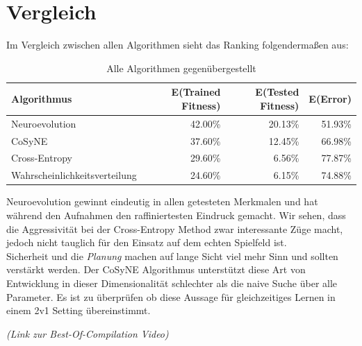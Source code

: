         \section{Vergleich} \label{algo-comparisson}
             Im Vergleich zwischen allen Algorithmen sieht das Ranking folgendermaßen aus:

                \begin{table}[H]
                    \begin{center}
                    \begin{tabular}{ |l|r|r|r| } 
                        \hline
                        \textbf{Algorithmus}          & E(Trained Fitness) & E(Tested Fitness) & E(Error)    \\ \hline
                        Neuroevolution                &          42.00\%   &         20.13\%   &    51.93\%  \\ \hline
                        CoSyNE                        &          37.60\%   &         12.45\%   &    66.98\%  \\ \hline
                        Cross-Entropy                 &          29.60\%   &          6.56\%   &    77.87\%  \\ \hline
                        Wahrscheinlichkeitsverteilung &          24.60\%   &          6.15\%   &    74.88\%  \\ \hline
                    \end{tabular}
                    \end{center}
                    \caption{Alle Algorithmen gegenübergestellt \label{fig:vergleichstabelle}}
                \end{table}

            \noindent
            Neuroevolution gewinnt eindeutig in allen getesteten Merkmalen und hat während den Aufnahmen den raffiniertesten Eindruck gemacht. Wir sehen, dass die Aggressivität bei der Cross-Entropy Method zwar interessante Züge macht, jedoch nicht tauglich für den Einsatz auf dem echten Spielfeld ist. \\[2mm]

            \noindent
            Sicherheit und die \textit{Planung} machen auf lange Sicht viel mehr Sinn und sollten verstärkt werden. Der CoSyNE Algorithmus unterstützt diese Art von Entwicklung in dieser Dimensionalität schlechter als die naive Suche über alle Parameter. Es ist zu überprüfen ob diese Aussage für gleichzeitiges Lernen in einem 2v1 Setting übereinstimmt.\\[2mm]

            \begin{center} \textit{(Link zur Best-Of-Compilation Video)} \end{center}